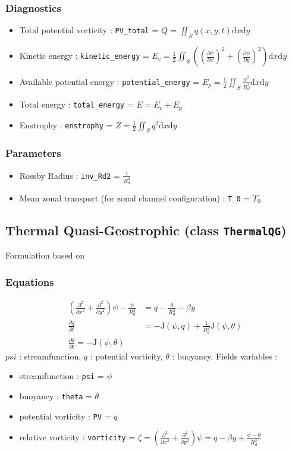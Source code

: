 \documentclass[12pt]{article}
\numberwithin{equation}{section}%
\begin{document}
\subsubsection{Diagnostics}
\begin{itemize}
	\item Total potential vorticity : \verb|PV_total| = $Q = \iint_S q(x, y, t) \mathrm{d}x\mathrm{d}y$
	\item Kinetic energy : \verb|kinetic_energy| = $E_c = \frac{1}{2} \iint_S \left((\frac{\partial \psi}{\partial x})^2 + (\frac{\partial \psi}{\partial y})^2\right) \mathrm{d}x\mathrm{d}y$
	\item Available potential energy : \verb|potential_energy| = $E_p = \frac{1}{2}\iint_S \frac{\psi^2}{R_d^2}\mathrm{d}x\mathrm{d}y$
	\item Total energy : \verb|total_energy| = $E = E_c + E_p$
	\item Enstrophy : \verb|enstrophy| = $Z =\frac{1}{2} \iint_S q^2 \mathrm{d}x\mathrm{d}y$
\end{itemize}
\subsubsection{Parameters}
\begin{itemize}
	\item Rossby Radius : \verb|inv_Rd2| = $\frac{1}{R_d^2}$
	\item Mean zonal transport (for zonal channel configuration) : \verb|T_0| = $T_0$
\end{itemize}
\subsection{Thermal Quasi-Geostrophic (class \texttt{ThermalQG})}
Formulation based on \cite{Warneford2013}
\subsubsection{Equations}
\begin{align}
	\left(\frac{\partial^2}{\partial x^2} + \frac{\partial^2}{\partial y^2}\right) \psi - \frac{\psi}{R_d^2} &= q -\frac{\theta}{R_d^2} -\beta y \\
	\frac{\partial q}{\partial t} &= -\mathrm{J}(\psi, q) + \frac{1}{R_d^2}\mathrm{J}(\psi, \theta) \\
	\frac{\partial \theta}{\partial t} = -\mathrm{J}(\psi, \theta)
\end{align}
$psi$ : streamfunction, $q$ : potential vorticity, $\theta$ : buoyancy. Fields variables : 
\begin{itemize}
	\item streamfunction : \verb|psi| = $\psi$
	\item buoyancy : \verb|theta| = $\theta$
	\item potential vorticity : \verb|PV| = $q$
	\item relative vorticity : \verb|vorticity| = $\zeta = \left(\frac{\partial^2}{\partial x^2} + \frac{\partial^2}{\partial y^2}\right) \psi = q -\beta y + \frac{\psi - \theta}{R_d^2}$
	
\end{itemize}
\end{document}

